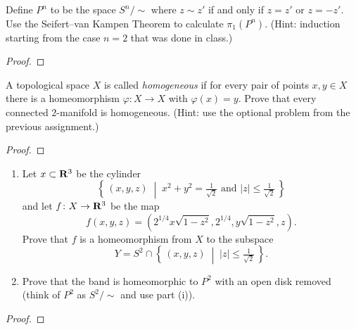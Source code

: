 \newpage
\begin{problem}[A]
Define $P^n$ to be the space $S^n/{\sim}$ where $z\sim z'$ if and only if
$z=z'$ or $z=-z'$. Use the Seifert--van Kampen Theorem to calculate
$\pi_1(P^n)$. (Hint: induction starting from the case $n=2$ that was done
in class.)
\end{problem}
\begin{proof}
\end{proof}
\newpage
\begin{problem}[B]
A topological space $X$ is called \emph{homogeneous} if for every pair of
points $x,y\in X$ there is a homeomorphism $\varphi\colon X\to X$ with
$\varphi(x)=y$. Prove that every connected $2$-manifold is
homogeneous. (Hint: use the optional problem from the previous assignment.)
\end{problem}
\begin{proof}
\end{proof}
\newpage
\begin{problem}
\begin{enumerate}[label=(\roman*)]
\item Let $x\subset\mathbf{R}^3$ be the cylinder
\[
\left\{\,(x,y,z)\;\middle|\;
\text{$x^2+y^2=\tfrac{1}{\sqrt{2}}$ and $|z|\leq \tfrac{1}{\sqrt{2}}$}\,\right\}
\]
and let $f\colon X\to\mathbf{R}^3$ be the map
\[
f(x,y,z)=\left(2^{1/4}x\sqrt{1-z^2},2^{1/4},y\sqrt{1-z^2},z\right).
\]
Prove that $f$ is a homeomorphism from $X$ to the subspace
\[
Y=S^2\cap\left\{\,(x,y,z)\;\middle|\;|z|\leq\tfrac{1}{\sqrt{2}}\,\right\}.
\]
\item Prove that the  band is homeomorphic to $P^2$ with an
  open disk removed (think of $P^2$ as $S^2/{\sim}$ and use part (i)).
\end{enumerate}
\end{problem}
\begin{proof}
\end{proof}

